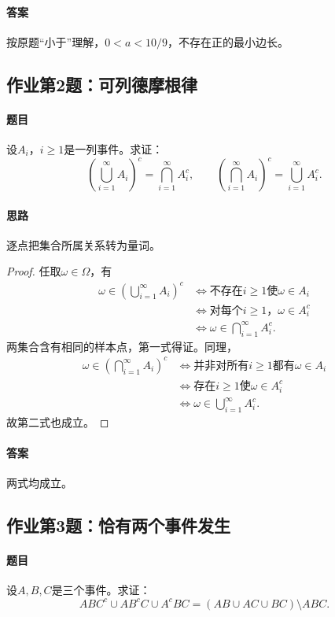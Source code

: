\paragraph{答案}按原题“小于”理解，$0<a<10/9$，不存在正的最小边长。

\subsection{作业第2题：可列德摩根律}\label{ex:w01-h2}
\paragraph{题目}
设$A_i$，$i\geq1$是一列事件。求证：
\[\left(\bigcup_{i=1}^{\infty}A_i\right)^c=\bigcap_{i=1}^{\infty}A_i^c,\qquad
\left(\bigcap_{i=1}^{\infty}A_i\right)^c=\bigcup_{i=1}^{\infty}A_i^c.\]
\paragraph{思路}逐点把集合所属关系转为量词。
\begin{proof}
任取$\omega\in\Omega$，有
\begin{align*}
\omega\in\left(\bigcup_{i=1}^{\infty}A_i\right)^c
&\iff \text{不存在$i\geq1$使$\omega\in A_i$}\\
&\iff \text{对每个$i\geq1$，$\omega\in A_i^c$}\\
&\iff \omega\in\bigcap_{i=1}^{\infty}A_i^c.
\end{align*}
两集合含有相同的样本点，第一式得证。同理，
\begin{align*}
\omega\in\left(\bigcap_{i=1}^{\infty}A_i\right)^c
&\iff \text{并非对所有$i\geq1$都有$\omega\in A_i$}\\
&\iff \text{存在$i\geq1$使$\omega\in A_i^c$}\\
&\iff \omega\in\bigcup_{i=1}^{\infty}A_i^c.
\end{align*}
故第二式也成立。
\end{proof}
\paragraph{答案}两式均成立。

\subsection{作业第3题：恰有两个事件发生}\label{ex:w01-h3}
\paragraph{题目}
设$A,B,C$是三个事件。求证：
\[ABC^c\cup AB^cC\cup A^cBC=(AB\cup AC\cup BC)\setminus ABC.\]
